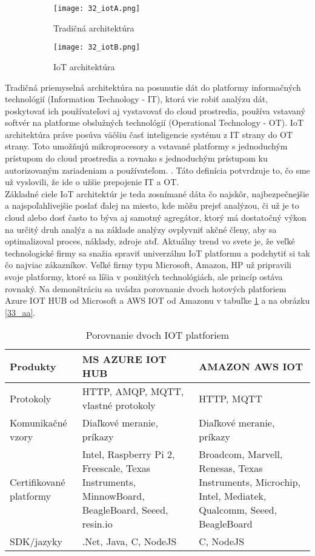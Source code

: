 \begin{figure}[!htbp]
\centering
\begin{subfigure}{0.5\linewidth}
\texttt{[image: 32\_iotA.png]}
\caption{Tradičná architektúra \cite{IOT21}}
\label{32_iotA}
\end{subfigure}%
\begin{subfigure}{0.5\linewidth}
\texttt{[image: 32\_iotB.png]}
\caption{IoT architektúra \cite{IOT21}}
\label{32_iotB}
\end{subfigure}
\caption{}
\end{figure}
Tradičná priemyselná architektúra na posunutie dát do platformy informačných technológií (Information Technology - IT), ktorá vie robiť analýzu dát, poskytovať ich používateľovi aj vystavovať do cloud prostredia, používa vstavaný softvér na platforme obslužných technológií (Operational Technology - OT). IoT architektúra práve posúva väčšiu časť inteligencie systému z IT strany do OT strany. Toto umožňujú mikroprocesory a vstavané platformy s jednoduchým prístupom do cloud prostredia a rovnako s jednoduchým prístupom ku autorizovaným zariadeniam a používateľom. \cite{IOT21}. Táto definícia potvrdzuje to, čo sme už vyslovili, že ide o užšie prepojenie IT a OT. \\
\indent Základné ciele IoT architektúr je teda zosnímané dáta čo najskôr, najbezpečnejšie a najspoľahlivejšie poslať ďalej na miesto, kde môžu prejsť analýzou, či už je to cloud alebo dosť často to býva aj samotný agregátor, ktorý má dostatočný výkon na určitý druh analýz a na základe analýzy ovplyvniť akčné členy, aby sa optimalizoval proces, náklady, zdroje atď. Aktuálny trend vo svete je, že  veľké technologické firmy sa snažia spraviť univerzálnu IoT platformu a podchytiť si tak čo najviac zákazníkov. Veľké firmy typu Microsoft, Amazon, HP už pripravili svoje platformy, ktoré sa líšia v použitých technológiách, ale princíp ostáva rovnaký. Na demonštráciu sa uvádza porovnanie dvoch hotových platforiem Azure IOT HUB od Microsoft a AWS IOT od Amazonu v tabuľke \ref{table:1} a na obrázku \ref{33_aa}.
\begin{table}[h!]
\centering
 \caption{Porovnanie dvoch IOT platforiem \cite{IOT22} }
 \begin{tabular}{ |p{4cm}|p{5.5cm}p{5.5cm}| } 
 \hline
 Produkty & MS AZURE IOT HUB & AMAZON AWS IOT \\ 
 \hline\hline
 Protokoly & HTTP, AMQP, MQTT, vlastné protokoly & HTTP, MQTT  \\ 
 \hline
 Komunikačné vzory & Diaľkové meranie, príkazy & Diaľkové meranie, príkazy \\
 \hline
 Certifikované platformy &  Intel, Raspberry Pi 2, Freescale, Texas Instruments, MinnowBoard, BeagleBoard, Seeed, resin.io & 
Broadcom, Marvell, Renesas, Texas Instruments, Microchip, Intel, Mediatek, Qualcomm, Seeed, BeagleBoard \\
 \hline
 SDK/jazyky & 	.Net, Java, C, NodeJS & C, NodeJS \\
 \hline
\end{tabular}
\label{table:1}
\end{table}

